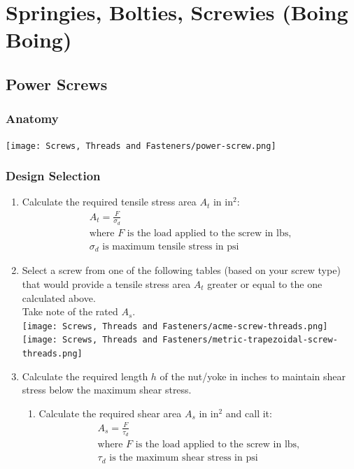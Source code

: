 \documentclass[11pt, fleqn]{article}
\begin{document}
\section{Springies, Bolties, Screwies (Boing Boing)}
\subsection{Power Screws}
\subsubsection{Anatomy}
\texttt{[image: Screws, Threads and Fasteners/power-screw.png]}
\subsubsection{Design Selection}
\begin{enumerate}
    \item Calculate the required tensile stress area $A_t$ in $\mathrm{in^2}$:
    \begin{align*}
        A_t=\frac{F}{\sigma_d}\\
        \text{where $F$ is the load applied to the screw in lbs,}\\
        \text{$\sigma_d$ is maximum tensile stress in psi}
    \end{align*}
    \item Select a screw from one of the following tables (based on your screw type) that would provide a tensile stress area $A_t$ greater or equal to the one calculated above.\\
    Take note of the rated $A_s$.\\
    \texttt{[image: Screws, Threads and Fasteners/acme-screw-threads.png]}\\
    \texttt{[image: Screws, Threads and Fasteners/metric-trapezoidal-screw-threads.png]}
    \item Calculate the required length $h$ of the nut/yoke in inches to maintain shear stress below the maximum shear stress.
    \begin{enumerate}
        \item Calculate the required shear area $A_s$ in $\mathrm{in^2}$ and call it:
        \begin{align*}
            A_s = \frac{F}{\tau_d}\\
            \text{where $F$ is the load applied to the screw in lbs,}\\
            \text{$\tau_d$ is the maximum shear stress in psi}
        \end{align*}

\end{enumerate}
\end{enumerate}
\end{document}
